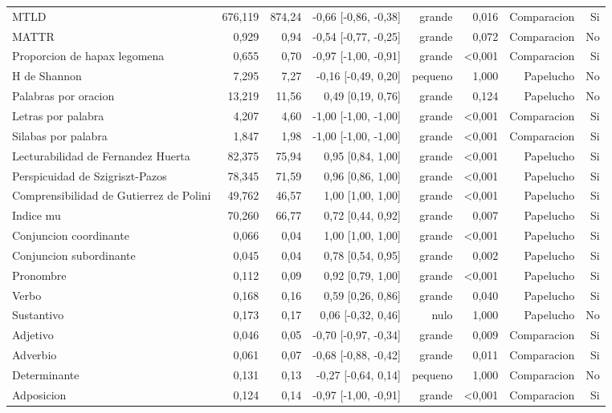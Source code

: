 \begin{table}[htbp]
\begin{tabular}{lrrrrrrr}
MTLD & 676,119 & 874,24 & -0,66 [-0,86, -0,38] & grande & 0,016 & Comparacion & Si \\
MATTR & 0,929 & 0,94 & -0,54 [-0,77, -0,25] & grande & 0,072 & Comparacion & No \\
Proporcion de hapax legomena & 0,655 & 0,70 & -0,97 [-1,00, -0,91] & grande & <0,001 & Comparacion & Si \\
H de Shannon & 7,295 & 7,27 & -0,16 [-0,49, 0,20] & pequeno & 1,000 & Papelucho & No \\
Palabras por oracion & 13,219 & 11,56 & 0,49 [0,19, 0,76] & grande & 0,124 & Papelucho & No \\
Letras por palabra & 4,207 & 4,60 & -1,00 [-1,00, -1,00] & grande & <0,001 & Comparacion & Si \\
Silabas por palabra & 1,847 & 1,98 & -1,00 [-1,00, -1,00] & grande & <0,001 & Comparacion & Si \\
Lecturabilidad de Fernandez Huerta & 82,375 & 75,94 & 0,95 [0,84, 1,00] & grande & <0,001 & Papelucho & Si \\
Perspicuidad de Szigriszt-Pazos & 78,345 & 71,59 & 0,96 [0,86, 1,00] & grande & <0,001 & Papelucho & Si \\
Comprensibilidad de Gutierrez de Polini & 49,762 & 46,57 & 1,00 [1,00, 1,00] & grande & <0,001 & Papelucho & Si \\
Indice mu & 70,260 & 66,77 & 0,72 [0,44, 0,92] & grande & 0,007 & Papelucho & Si \\
Conjuncion coordinante & 0,066 & 0,04 & 1,00 [1,00, 1,00] & grande & <0,001 & Papelucho & Si \\
Conjuncion subordinante & 0,045 & 0,04 & 0,78 [0,54, 0,95] & grande & 0,002 & Papelucho & Si \\
Pronombre & 0,112 & 0,09 & 0,92 [0,79, 1,00] & grande & <0,001 & Papelucho & Si \\
Verbo & 0,168 & 0,16 & 0,59 [0,26, 0,86] & grande & 0,040 & Papelucho & Si \\
Sustantivo & 0,173 & 0,17 & 0,06 [-0,32, 0,46] & nulo & 1,000 & Papelucho & No \\
Adjetivo & 0,046 & 0,05 & -0,70 [-0,97, -0,34] & grande & 0,009 & Comparacion & Si \\
Adverbio & 0,061 & 0,07 & -0,68 [-0,88, -0,42] & grande & 0,011 & Comparacion & Si \\
Determinante & 0,131 & 0,13 & -0,27 [-0,64, 0,14] & pequeno & 1,000 & Comparacion & No \\
Adposicion & 0,124 & 0,14 & -0,97 [-1,00, -0,91] & grande & <0,001 & Comparacion & Si \\

\end{tabular}
\end{table}
